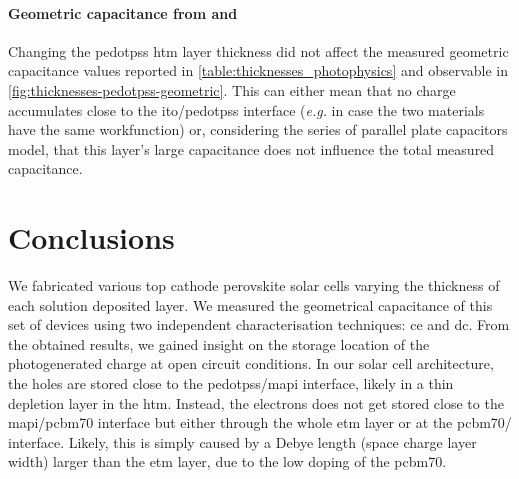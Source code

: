 	\paragraph{Geometric capacitance from  and }
	Changing the \gls{pedotpss} \gls{htm} layer thickness did not affect the measured geometric capacitance values reported in \cref{table:thicknesses_photophysics} and observable in \cref{fig:thicknesses-pedotpss-geometric}.
	This can either mean that no charge accumulates close to the \gls{ito}\-/\gls{pedotpss} interface (\textsl{e.g.} in case the two materials have the same workfunction) or, considering the series of parallel plate capacitors model, that this layer's large capacitance does not influence the total measured capacitance.


\section{Conclusions}
We fabricated various top cathode perovskite solar cells varying the thickness of each solution deposited layer.
We measured the geometrical capacitance of this set of devices using two independent characterisation techniques: \gls{ce} and \gls{dc}.
From the obtained results, we gained insight on the storage location of the photogenerated charge at open circuit conditions.
In our solar cell architecture, the holes are stored close to the \gls{pedotpss}\-/\gls{mapi} interface, likely in a thin depletion layer in the \gls{htm}.
Instead, the electrons does not get stored close to the \gls{mapi}\-/\gls{pcbm70} interface but either through the whole \gls{etm} layer or at the \gls{pcbm70}\-/ interface.
Likely, this is simply caused by a Debye length (space charge layer width) larger than the \gls{etm} layer, due to the low doping of the \gls{pcbm70}. 


